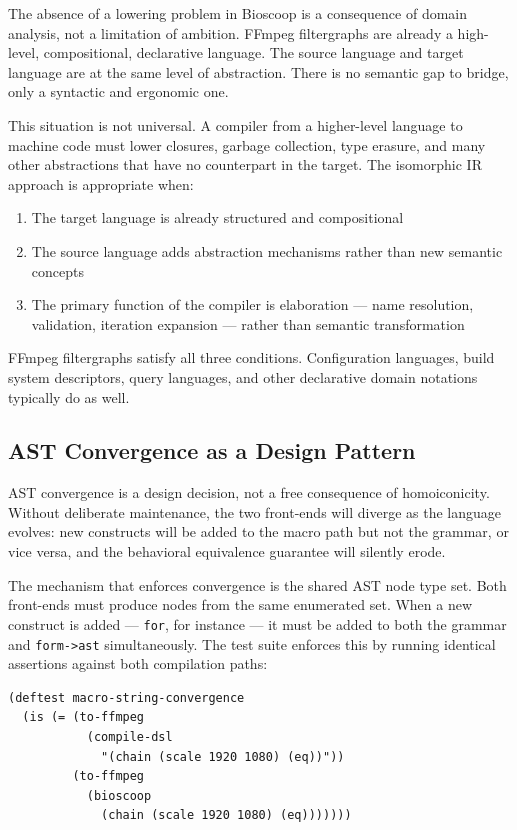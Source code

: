 \documentclass[conference]{IEEEtran}
\begin{document}
The absence of a lowering problem in Bioscoop is a consequence of domain analysis, not a limitation of ambition. FFmpeg filtergraphs are already a high-level, compositional, declarative language. The source language and target language are at the same level of abstraction. There is no semantic gap to bridge, only a syntactic and ergonomic one.

This situation is not universal. A compiler from a higher-level language to machine code must lower closures, garbage collection, type erasure, and many other abstractions that have no counterpart in the target. The isomorphic IR approach is appropriate when:

\begin{enumerate}
\item The target language is already structured and compositional
\item The source language adds abstraction mechanisms rather than new semantic concepts
\item The primary function of the compiler is elaboration --- name resolution, validation, iteration expansion --- rather than semantic transformation
\end{enumerate}

FFmpeg filtergraphs satisfy all three conditions. Configuration languages, build system descriptors, query languages, and other declarative domain notations typically do as well.

\subsection{AST Convergence as a Design Pattern}

AST convergence is a design decision, not a free consequence of homoiconicity. Without deliberate maintenance, the two front-ends will diverge as the language evolves: new constructs will be added to the macro path but not the grammar, or vice versa, and the behavioral equivalence guarantee will silently erode.

The mechanism that enforces convergence is the shared AST node type set. Both front-ends must produce nodes from the same enumerated set. When a new construct is added --- \texttt{for}, for instance --- it must be added to both the grammar and \texttt{form->ast} simultaneously. The test suite enforces this by running identical assertions against both compilation paths:

\begin{lstlisting}[caption={Convergence test pattern}]
(deftest macro-string-convergence
  (is (= (to-ffmpeg
           (compile-dsl
             "(chain (scale 1920 1080) (eq))"))
         (to-ffmpeg
           (bioscoop
             (chain (scale 1920 1080) (eq)))))))
\end{lstlisting}
\end{document}
